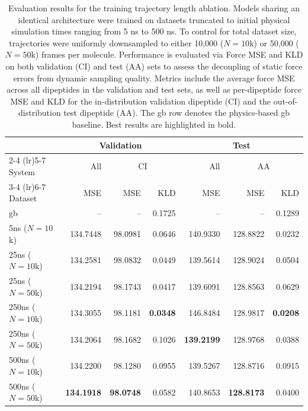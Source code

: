 \begin{table}[htbp]
\centering
\caption{Evaluation results for the training trajectory length ablation. Models sharing an identical architecture were trained on datasets truncated to initial physical simulation times ranging from 5 ns to 500 ns. To control for total dataset size, trajectories were uniformly downsampled to either 10,000 ($N=10$k) or 50,000 ($N=50$k) frames per molecule. Performance is evaluated via Force MSE and KLD on both validation (CI) and test (AA) sets to assess the decoupling of static force errors from dynamic sampling quality. Metrics include the average force MSE across all dipeptides in the validation and test sets, as well as per-dipeptide force MSE and KLD for the in-distribution validation dipeptide (CI) and the out-of-distribution test dipeptide (AA). The \gls{gb} row denotes the physics-based \gls{gb} baseline. Best results are highlighted in bold.}
\label{tab:dataset_ablation}
\begin{tabular}{l r r r r r r}
\toprule
& \multicolumn{3}{c}{Validation} & \multicolumn{3}{c}{Test} \\
\cmidrule(lr){2-4} \cmidrule(lr){5-7}
System & All & \multicolumn{2}{c}{CI} & All & \multicolumn{2}{c}{AA} \\
\cmidrule(lr){3-4} \cmidrule(lr){6-7}
Dataset & MSE & MSE & KLD & MSE & MSE & KLD \\
\midrule
\gls{gb} & -- & -- & 0.1725 & -- & -- & 0.1289 \\
\midrule
5ns ($N=10$k) & 134.7448 & 98.0981 & 0.0646 & 140.9330 & 128.8822 & 0.0232 \\
\midrule
25ns ($N=10$k) & 134.2581 & 98.0832 & 0.0449 & 139.5614 & 128.9024 & 0.0504 \\
25ns ($N=50$k) & 134.2194 & 98.1743 & 0.0417 & 139.6091 & 128.8563 & 0.0629 \\
\midrule
250ns ($N=10$k) & 134.3055 & 98.1181 & \textbf{0.0348} & 146.8484 & 128.9817 & \textbf{0.0208} \\
250ns ($N=50$k) & 134.2064 & 98.1682 & 0.1026 & \textbf{139.2199} & 128.9768 & 0.0388 \\
\midrule
500ns ($N=10$k) & 134.2200 & 98.1280 & 0.0955 & 139.5267 & 128.8716 & 0.0915 \\
500ns ($N=50$k) & \textbf{134.1918} & \textbf{98.0748} & 0.0582 & 140.8653 & \textbf{128.8173} & 0.0400 \\
\bottomrule
\end{tabular}
\end{table}






